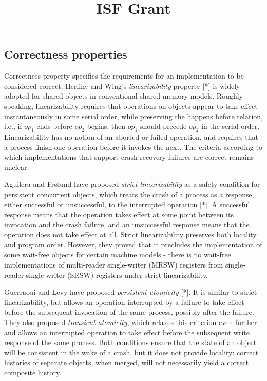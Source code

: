 \documentclass{article}
\title{ISF Grant}
\author{}
\begin{document}
\maketitle


\subsection{Correctness properties}
Correctness property specifies the requirements for an implementation to be considered correct. Herlihy and Wing’s \emph{linearizability} property [*] is widely adopted for shared objects in conventional shared memory models.  Roughly speaking, linearizability requires that operations on objects appear to take effect instantaneously in some serial order, while preserving the happens before relation, i.e., if $op_1$ ends before $op_2$ begins, then $op_1$ should precede $op_2$ in the serial order. Linearizability has no notion of an aborted or failed operation, and requires that a process finish one operation before it invokes the next. The criteria according to which implementations that support crash-recovery failures are correct remains unclear.

Aguilera and Frølund have proposed \emph{strict linearizability} as a safety condition for persistent concurrent objects, which treats the crash of a process as a response, either successful or unsuccessful, to the interrupted operation [*]. A successful response means that the operation takes effect at some point between its invocation and the crash failure, and an unsuccessful response means that the operation does not take effect at all. Strict linearizability preserves both locality and program order. However, they proved that it precludes the implementation of some wait-free objects for certain machine models - there is no wait-free implementations of multi-reader single-writer (MRSW) registers from single-reader single-writer (SRSW) registers under strict linearizability.

Guerraoui and Levy have proposed \emph{persistent atomicity} [*]. It is similar to strict linearizability, but allows an operation interrupted by a failure to take effect before the subsequent invocation of the same process, possibly after the failure. They also proposed \emph{transient atomicity}, which relaxes this criterion even further and allows an interrupted operation to take effect before the subsequent write response of the same process. Both conditions ensure that the state of an object will be consistent in the wake of a crash, but it does not provide locality: correct histories of separate objects, when merged, will not necessarily yield a correct composite history.
\end{document}
